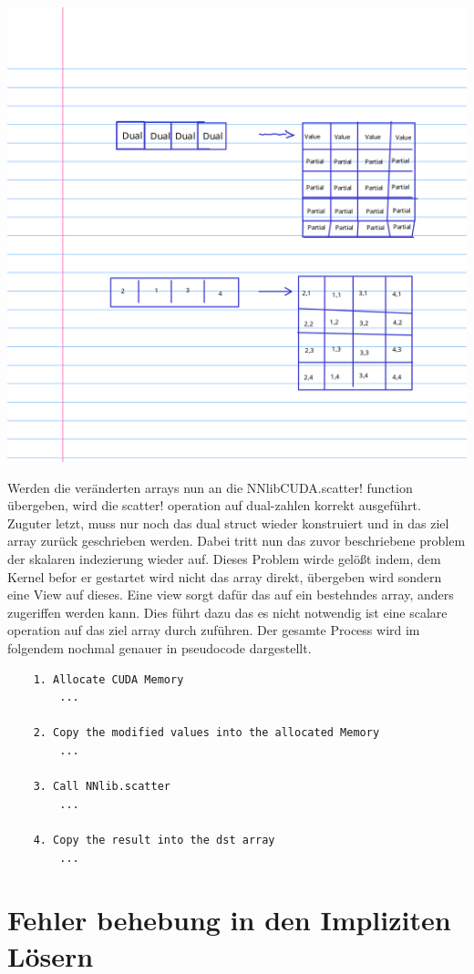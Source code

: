\includegraphics[width=\textwidth]{Data/02_Versuch/cropted.png}

Werden die veränderten arrays nun an die NNlibCUDA.scatter! function übergeben,
wird die scatter! operation auf dual-zahlen korrekt ausgeführt.
Zuguter letzt, muss nur noch das dual struct wieder konstruiert und in das ziel array zurück geschrieben werden. 
Dabei tritt nun das zuvor beschriebene problem der skalaren indezierung wieder auf.
Dieses Problem wirde gelößt indem, dem Kernel befor er gestartet wird nicht das array direkt, übergeben wird
sondern eine View auf dieses.
Eine view sorgt dafür das auf ein bestehndes array, anders zugeriffen werden kann.
Dies führt dazu das es nicht notwendig ist eine scalare operation auf das ziel array durch zuführen.
Der gesamte Process wird im folgendem nochmal genauer in pseudocode dargestellt.

\begin{verbatim}
	1. Allocate CUDA Memory 
		...		
		
	2. Copy the modified values into the allocated Memory
		...
		
	3. Call NNlib.scatter
		...
		
	4. Copy the result into the dst array
		...
\end{verbatim}


\section{ Fehler behebung in den Impliziten Lösern }

